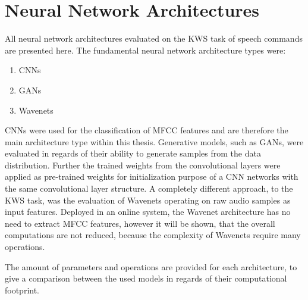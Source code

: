 
\section{Neural Network Architectures}\label{sec:nn_arch}
\thesisStateRevised
All neural network architectures evaluated on the KWS task of speech commands are presented here.
The fundamental neural network architecture types were:
\begin{enumerate}
	\item CNNs
	\item GANs
	\item Wavenets
\end{enumerate}
CNNs were used for the classification of  MFCC features and are therefore the main architecture type within this thesis.
Generative models, such as GANs, were evaluated in regards of their ability to generate samples from the data distribution.
Further the trained weights from the convolutional layers were applied as pre-trained weights for initialization purpose of a CNN networks with the same convolutional layer structure.
A completely different approach, to the KWS task, was the evaluation of Wavenets operating on raw audio samples as input features.
Deployed in an online system, the Wavenet architecture has no need to extract MFCC features, however it will be shown, that the overall computations are not reduced, because the complexity of Wavenets require many operations.

The amount of parameters and operations are provided for each architecture, to give a comparison between the used models in regards of their computational footprint.




